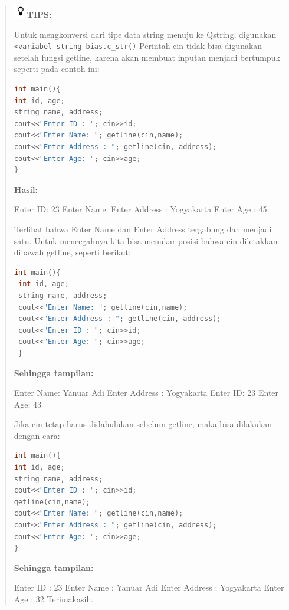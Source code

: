 \begin{quotation}

\includegraphics{../manuscript/images/tips}\textbf{TIPS:} 

Untuk
mengkonversi dari tipe data string menuju ke Qstring, digunakan
\texttt{\textless{}variabel\ string\ bias.c\_str()} Perintah cin tidak
bisa digunakan setelah fungsi getline, karena akan membuat inputan
menjadi bertumpuk seperti pada contoh ini:

\begin{lstlisting}[language=c++, numbers=none]
int main(){
int id, age;
string name, address;
cout<<"Enter ID : "; cin>>id;
cout<<"Enter Name: "; getline(cin,name);
cout<<"Enter Address : "; getline(cin, address);
cout<<"Enter Age: "; cin>>age;
}
\end{lstlisting}

\textbf{Hasil:}

\begin{lcverbatim}
Enter ID: 23
Enter Name: Enter Address : Yogyakarta
Enter Age : 45
\end{lcverbatim}

Terlihat bahwa Enter Name dan Enter Address tergabung dan menjadi satu.
Untuk mencegahnya kita bisa menukar posisi bahwa cin diletakkan dibawah
getline, seperti berikut:

\begin{lstlisting}[language=c++, numbers=none]
int main(){
 int id, age;
 string name, address;
 cout<<"Enter Name: "; getline(cin,name);
 cout<<"Enter Address : "; getline(cin, address);
 cout<<"Enter ID : "; cin>>id;
 cout<<"Enter Age: "; cin>>age;
 }
\end{lstlisting}

\textbf{Sehingga tampilan:}

\begin{lcverbatim}
Enter Name: Yanuar Adi
Enter Address : Yogyakarta
Enter ID: 23
Enter Age: 43
\end{lcverbatim}

Jika cin tetap harus didahulukan sebelum getline, maka bisa dilakukan
dengan cara:

\begin{lstlisting}[language=c++, numbers=none]
int main(){
int id, age;
string name, address;
cout<<"Enter ID : "; cin>>id;
getline(cin,name);
cout<<"Enter Name: "; getline(cin,name);
cout<<"Enter Address : "; getline(cin, address);
cout<<"Enter Age: "; cin>>age;
}
\end{lstlisting}

\textbf{Sehingga tampilan:}

\begin{lcverbatim}
Enter ID : 23
Enter Name : Yanuar Adi
Enter Address : Yogyakarta
Enter Age : 32
Terimakasih.
\end{lcverbatim}
\end{quotation}

